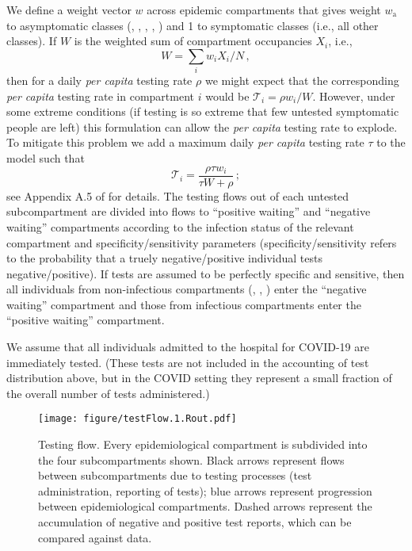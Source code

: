 \documentclass[12pt]{article}\usepackage[]{graphicx}\usepackage[]{color}
\begin{document}
We define a weight vector $w$ across epidemic compartments that gives weight $w_\textrm{a}$ to asymptomatic classes (, , , , ) and 1 to symptomatic classes (i.e., all other classes).
If $W$ is the weighted sum of compartment occupancies $X_i$, i.e., 
\begin{equation}
W = \sum_i w_i X_i/N \,,
\end{equation}
then for a daily \emph{per capita} testing rate $\rho$ we might expect that the corresponding \emph{per capita} testing rate in compartment $i$ would be ${\mathcal T}_i = \rho w_i/W$. 
However, under some extreme conditions (if testing is so extreme that few untested symptomatic people are left) this formulation can allow the \emph{per capita} testing rate to explode. To mitigate this problem we add a maximum daily \emph{per capita} testing rate $\tau$ to the model such that
\begin{equation}
{\mathcal T}_i = \frac{\rho \tau w_i}{\tau W + \rho} \,;
\end{equation}
see Appendix A.5 of \cite{Ghar+22} for details.  The testing flows out of each untested subcompartment are divided into flows to ``positive waiting'' and ``negative waiting'' compartments according to the infection status of the relevant compartment and specificity/sensitivity parameters (specificity/sensitivity refers to the probability that a truely negative/positive individual tests negative/positive).   If tests are assumed to be perfectly specific and sensitive, then all individuals from non-infectious compartments (, , ) enter the ``negative waiting'' compartment and those from infectious compartments enter the ``positive waiting'' compartment.

We assume that all individuals admitted to the hospital for COVID-19 are immediately tested. (These tests are not included in the accounting of test distribution above, but in the COVID setting they represent a small fraction of the overall number of tests administered.)

\begin{figure}
  \texttt{[image: figure/testFlow.1.Rout.pdf]}
  \caption{Testing flow. Every epidemiological compartment is subdivided into the four subcompartments shown.
    Black arrows represent flows between subcompartments due to testing processes (test administration, reporting of tests); blue arrows represent progression between epidemiological compartments.
    Dashed arrows represent the accumulation of negative and positive test reports, which can be compared against data.
    }
  \label{fig:testing_flow}
\end{figure}
\end{document}
